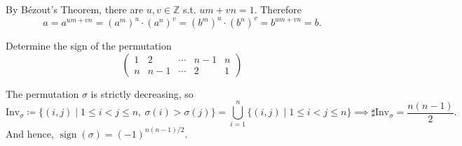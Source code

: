 \begin{solution}
    By B\'ezout's Theorem, there are $ u,v\in\mathbb{Z}$ s.t. $u m+v n=1$. Therefore
        \[
            a=a^{u m+v n}=(a^{m})^{u}\cdot(a^{n})^{v}=(b^{m})^{u}\cdot(b^{n})^{v}=b^{u m+v n}=b.
        \]
\end{solution}

\setcounter{pb}{16}
\begin{problem}
    Determine the sign of the permutation   
    \[
    \begin{pmatrix}
    1 & 2 & \cdots & n-1 & n \\
    n & n-1 & \cdots & 2 & 1
    \end{pmatrix}
    \]
\end{problem}

\begin{solution}
    The permutation $\sigma$ is strictly decreasing, so
    \[
        \mathrm{Inv}_{\sigma}\coloneqq \{(i,j)\mid 1\leq i<j\leq n,\ \sigma(i)>\sigma(j) \}=\bigcup_{i=1}^{n}\{(i,j)\mid 1\leq i<j\leq n\}\implies\sharp\mathrm{Inv}_{\sigma}=\frac{n(n-1)}{2}.
    \]
    And hence, $\operatorname{sign}(\sigma)=(-1)^{n(n-1)/2}$.
\end{solution}

